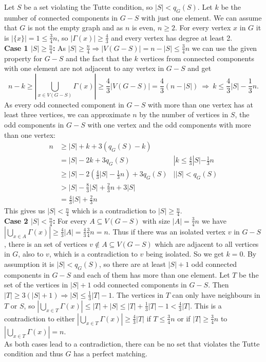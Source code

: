 \documentclass{article}
\begin{document}
Let $S$ be a set violating the Tutte condition, so $|S|<q_G(S)$.
Let $k$ be the number of connected components in $G-S$ with just one element. We can assume that $G$ is not the empty graph and as $n$ is even, $n\geq 2$. For every vertex $x$ in $G$ it is $|\{x\}|=1\leq \frac 34 n$, so $\left|\Gamma(x)\right| \geq \frac{4}{3}$ and every vertex has degree at least 2. \\

\textbf{Case 1 $|S|\geq \frac n4$:} As $|S|\geq \frac n4 \Rightarrow |V(G-S)|=n-|S|\leq \frac34 n$ we can use the given property for $G-S$ and the fact that the $k$ vertices from connected components with one element are not adjacent to any vertex in $G-S$ and get $$n-k\geq \left|\bigcup_{x \in V(G-S)}\Gamma(x)\right| \geq \frac{4}{3}|V(G-S)|=\frac 43(n-|S|) ~ \Rightarrow ~ k\leq \frac{4}{3}|S| - \frac{1}{3}n.$$
As every odd connected component in $G-S$ with more than one vertex has at least three vertices, we can approximate $n$ by the number of vertices in $S$, the odd components in $G-S$ with one vertex and the odd components with more than one vertex:
\begin{align*}n&\geq |S|+k+3(q_G(S)-k)&\\
&=|S|-2k+3q_G(S) &|k\leq \frac{4}{3}|S| - \frac{1}{3}n \\
&\geq  |S|-2\left(\frac{4}{3}|S| - \frac{1}{3}n\right)+3q_G(S) &||S|<q_G(S)\\
&>|S|-\frac{8}{3}|S| + \frac{2}{3}n+3|S|&\\
&=\frac{4}{3}|S| + \frac{2}{3}n&
\end{align*}
This gives us $|S|<\frac n4$ which is a contradiction to $|S|\geq \frac n4$.\\

\textbf{Case 2 $|S|< \frac n4$:}
For every $A\subseteq V(G-S)$ with size $|A|=\frac 34 n$ we have  $ \left|\bigcup_{x \in A}\Gamma(x)\right| \geq \frac{4}{3}|A|=\frac 43 \frac 34 n=n$. Thus if there was an isolated vertex $v$ in $G-S$, there is an set of vertices $v\notin A\subseteq V(G-S)$ which are adjacent to all vertices in $G$, also to $v$, which is a contradiction to $v$ being isolated. So we get $k=0$.
By assumption it is $|S|<q_G(S)$, so there are at least $|S|+1$ odd connected components in $G-S$ and each of them has more than one element. Let $T$ be the set of the vertices in $|S|+1$ odd connected components in $G-S$. Then $|T|\geq 3(|S|+1)\Rightarrow |S|\leq \frac 13 |T|-1$. The vertices in $T$ can only have neighbours in $T$ or $S$, so $\left|\bigcup_{x \in T}\Gamma(x)\right|\leq |T|+|S|\leq |T|+\frac 13 |T|-1<\frac 43 |T|$. This is a contradiction to either $\left|\bigcup_{x \in T}\Gamma(x)\right| \geq \frac{4}{3}|T|$ if $T\leq\frac 34 n$ or if $|T|\geq \frac 34 n$ to $\left|\bigcup_{x \in T}\Gamma(x)\right|=n$.\\

As both cases lead to a contradiction, there can be no set that violates the Tutte condition and thus $G$ has a perfect matching.
\end{document}
